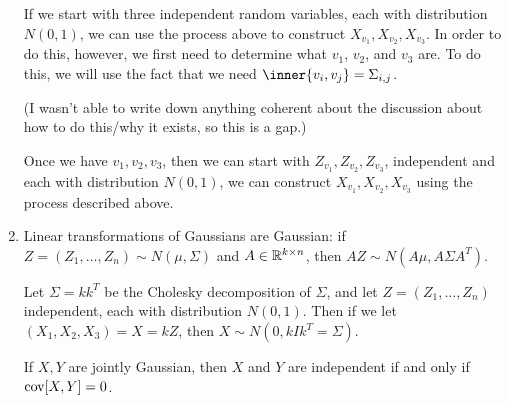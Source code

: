 \documentclass[../../../Master/AppliedStochastics.tex]{subfiles}
\begin{document}
\begin{enumerate}[(1)]
\begin{example}
    
    If we start with three independent random variables,
        each with distribution $N(0, 1)$,
        we can use the process above to construct $X_{v_1}, X_{v_2}, X_{v_3}$.
    In order to do this, however,
        we first need to determine what $v_1$, $v_2$, and $v_3$ are.
    To do this,
        we will use the fact that we need $\inner{v_i, v_j} = \Sigma_{i,j}$.
    
    
    (I wasn't able to write down anything coherent about the discussion
        about how to do this/why it exists, so this is a gap.)
    
    
    Once we have $v_1, v_2, v_3$,
        then we can start with $Z_{v_1}, Z_{v_2}, Z_{v_3}$,
        independent and each with distribution $N(0, 1)$,
        we can construct $X_{v_1}, X_{v_2}, X_{v_3}$
        using the process described above.
    \end{example}


    \item
    Linear transformations of Gaussians are Gaussian:
        if $Z = (Z_1, \dots, Z_n) \sim N(\mu, \Sigma)$
            and $A \in \mathbb{R}^{k \times n}$, then $A Z \sim N(A \mu, A \Sigma A^T)$.
    
    \begin{example}
        Let $\Sigma= k k^T$ be the Cholesky decomposition of $\Sigma$,
            and let $Z = (Z_1, \dots, Z_n)$ independent,
            each with distribution $N(0, 1)$.
    Then if we let $(X_1, X_2, X_3) = X = k Z$,
        then $X \sim N(0, k I k^T = \Sigma)$.
    \end{example}
    
    If $X, Y$ are jointly Gaussian,
        then $X$ and $Y$ are independent if and only if $\operatorname{cov}[X, Y] = 0$.
\end{enumerate}


%
\end{document}
